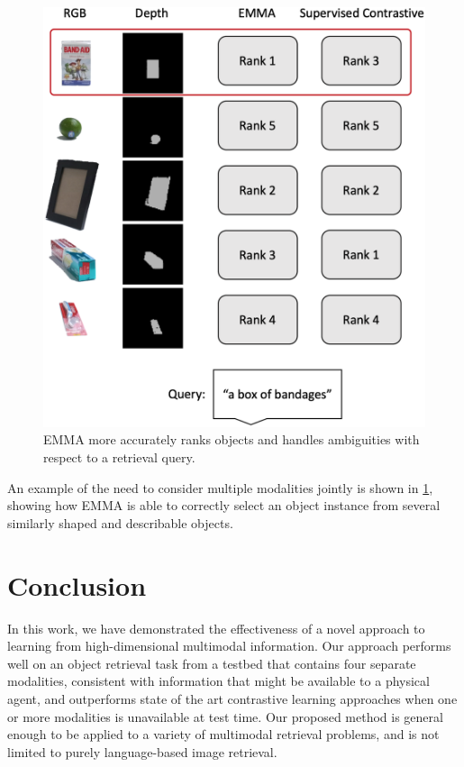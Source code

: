 \documentclass[sigconf,natbib=true,anonymous=true]{acmart}
\begin{document}
\begin{figure}[h!]
\centering
\includegraphics[width=.8\columnwidth]{Figures/example-rankings.png}
\caption{EMMA more accurately ranks objects and handles ambiguities with respect to a retrieval query.}
\label{fig:rankings}
\end{figure}

An example of the need to consider multiple modalities jointly is shown in \cref{fig:rankings}, showing how EMMA is able to correctly select an object instance from several similarly shaped and describable objects. 



\section{Conclusion}
\label{sec:conclusion}

In this work, we have demonstrated the effectiveness of a novel approach to learning from high-dimensional multimodal information. Our approach performs well on an object retrieval task from a testbed that contains four separate modalities, consistent with information that might be available to a physical agent, and outperforms state of the art contrastive learning approaches when one or more modalities is unavailable at test time. Our proposed method is general enough to be applied to a variety of multimodal retrieval problems, and is not limited to purely language-based image retrieval. 
\end{document}
